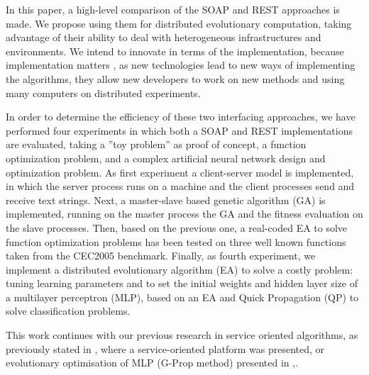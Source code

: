 \documentclass[final,1p,times]{elsarticle}
\begin{document}
In this paper, a high-level comparison of the SOAP and REST approaches is made. We propose using them for distributed evolutionary computation, taking advantage of their ability to deal with heterogeneous infrastructures and environments.
We intend to innovate in terms of the implementation, because implementation matters \cite{jjiwann2011}, as new technologies lead to new ways of implementing the algorithms, they allow new developers to work on new methods and using many computers on distributed experiments.

In order to determine the efficiency of these two interfacing approaches, we have performed four experiments in which both a SOAP and REST implementations are evaluated, taking a ''toy problem'' as proof of concept, a function optimization problem, and a complex artificial neural network design and optimization problem. 
As first experiment a client-server model is implemented, in which the server process runs on a machine and the client processes send and receive text strings.
Next, a master-slave based genetic algorithm (GA) is implemented, running on the master process the GA and the fitness evaluation on the slave processes.
Then, based on the previous one, a real-coded EA to solve function optimization problems has been tested on three well known functions taken from the CEC2005 benchmark.
Finally, as fourth experiment, we implement a distributed evolutionary algorithm (EA) to solve a costly problem: tuning learning parameters and to set the initial weights and hidden layer size of a multilayer perceptron (MLP), based on an EA and Quick Propagation \cite{FahlmanQP} (QP) to solve classification problems.

This work continues with our previous research in service oriented algorithms, as previously stated in \cite{OSGILIATH}, where a service-oriented platform was presented, or evolutionary optimisation of MLP (G-Prop method) presented in \cite{CastilloNPL},\cite{castilloNC}. 
\end{document}
